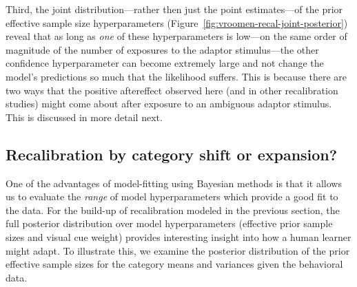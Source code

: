Third, the joint distribution---rather then just the point estimates---of the prior effective sample size hyperparameters (Figure~\ref{fig:vroomen-recal-joint-posterior}) reveal that as long as \emph{one} of these hyperparameters is low---on the same order of magnitude of the number of exposures to the adaptor stimulus---the other confidence hyperparameter can become extremely large and not change the model's predictions so much that the likelihood suffers.  This is because there are two ways that the positive aftereffect observed here (and in other recalibration studies) might come about after exposure to an ambiguous adaptor stimulus. This is discussed in more detail next.



\subsection{Recalibration by category shift or expansion?}
\label{sec:recal-categ-shift}

One of the advantages of model-fitting using Bayesian methods is that it allows us to evaluate the {\em range} of model hyperparameters which provide a good fit to the data. For the build-up of recalibration modeled in the previous section, the full posterior distribution over model hyperparameters (effective prior sample sizes and visual cue weight) provides interesting insight into how a human learner might adapt. To illustrate this, we examine the posterior distribution of the prior effective sample sizes for the category means and variances given the behavioral data.

